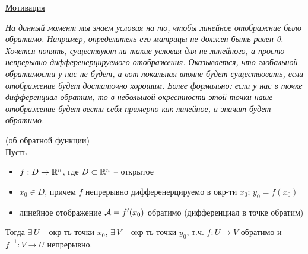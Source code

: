 \underline{Мотивация}

\quad \textit{На данный момент мы знаем условия на то, чтобы линейное отображние было обратимо.
Например, определитель его матрицы не должен быть равен 0. 
Хочется понять, существуют ли такие условия для не линейного, а просто непрерывно дифференерцируемого отображения.
Оказывается, что глобальной обратимости у нас не будет, а вот локальная вполне будет существовать, если отображение будет достаточно хорошим.
Более формально: если у нас в точке дифференциал обратим, то в небольшой окрестности этой точки наше отображение будет вести себя примерно как линейное, а значит будет обратимо.}

\begin{theorem} (об обратной функции) \\
    Пусть
    \begin{itemize}
        \item $f: D \to \mathbb{R}^n$, где $D \subset \mathbb{R}^n$ -- открытое
        \item $x_0 \in D$, причем $f$ непрерывно дифференерцируемо в окр-ти $x_0$; $y_0 = f(x_0)$
        \item линейное отображение $\mathcal{A} = f'(x_0)$ обратимо (дифференциал в точке обратим)
    \end{itemize} 
    Тогда $\exists \, U$ -- окр-ть точки $x_0$, $\exists \, V$ -- окр-ть точки $y_0$, т.ч. $f: U \to V$ обратимо и  $f^{-1}: V \to U$ непрерывно.
\end{theorem}
